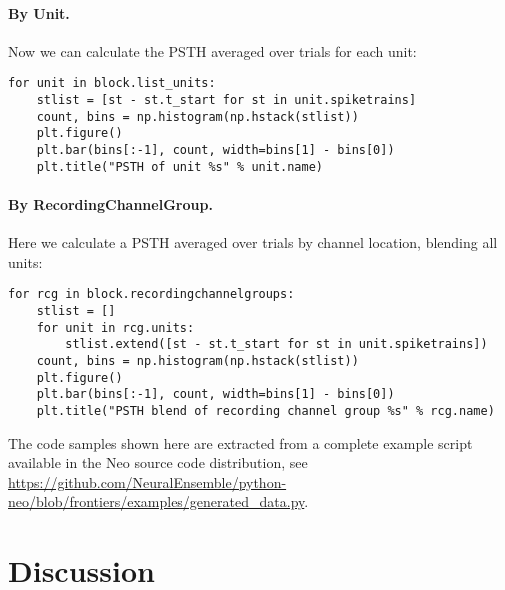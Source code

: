 \documentclass{frontiers}
\begin{document}
\paragraph{By Unit.}
Now we can calculate the PSTH averaged over trials for each unit:

\begin{lstlisting}[style=display]
for unit in block.list_units:
    stlist = [st - st.t_start for st in unit.spiketrains]
    count, bins = np.histogram(np.hstack(stlist))
    plt.figure()
    plt.bar(bins[:-1], count, width=bins[1] - bins[0])
    plt.title("PSTH of unit %s" % unit.name)
\end{lstlisting}


\paragraph{By RecordingChannelGroup.}
Here we calculate a PSTH averaged over trials by channel location, blending all units:
\begin{lstlisting}[style=display]
for rcg in block.recordingchannelgroups:
    stlist = []
    for unit in rcg.units:
        stlist.extend([st - st.t_start for st in unit.spiketrains])
    count, bins = np.histogram(np.hstack(stlist))
    plt.figure()
    plt.bar(bins[:-1], count, width=bins[1] - bins[0])
    plt.title("PSTH blend of recording channel group %s" % rcg.name)
\end{lstlisting}

The code samples shown here are extracted from a complete example script available in the Neo source code distribution, see \url{https://github.com/NeuralEnsemble/python-neo/blob/frontiers/examples/generated_data.py}.

\section{Discussion}

\end{document}
